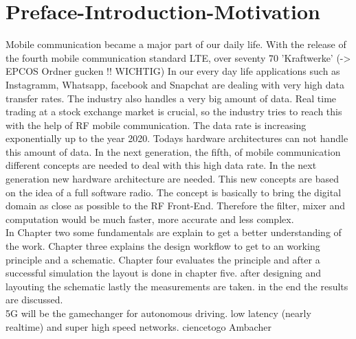 \chapter{Preface-Introduction-Motivation}
Mobile communication became a major part of our daily life. With the release of the fourth mobile communication standard LTE, over seventy 70 'Kraftwerke' (-> EPCOS Ordner gucken !! WICHTIG)
In our every day life applications such as Instagramm, Whatsapp, facebook and Snapchat  are dealing with very high data transfer rates. The industry also handles a very big amount of data. Real time trading at a stock exchange market is crucial, so the industry tries to reach this with the help of RF mobile communication. The data rate is increasing exponentially up to the year 2020. Todays hardware architectures can not handle this amount of data. In the next generation, the fifth, of mobile communication different concepts are needed to deal with this high data rate. In the next generation new hardware architecture are needed. This new concepts are based on the idea of a full software radio. The concept is basically to bring the digital domain as close as possible to the RF Front-End. Therefore the filter, mixer and computation would be much faster, more accurate and less complex. \\
In Chapter two some fundamentals are explain to get a better understanding of the work. Chapter three explains the design workflow to get to an working principle and a schematic. Chapter four evaluates the principle and after a successful simulation the layout is done in chapter five. after designing and layouting the schematic lastly the measurements are taken. in the end the results are discussed.\\
5G will be the gamechanger for autonomous driving. low latency (nearly realtime) and super high speed networks.
\vspace{2cm}
ciencetogo Ambacher

